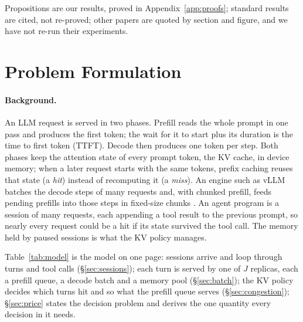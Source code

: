 \documentclass{article}
\theoremstyle{plain}
\theoremstyle{definition}
\theoremstyle{remark}
\begin{document}
Propositions are our results, proved in Appendix~\ref{app:proofs};
standard results are cited, not re-proved; other papers are quoted by
section and figure, and we have not re-run their experiments.

\section{Problem Formulation}\label{sec:model}

\paragraph{Background.} An LLM request is served in two phases. Prefill
reads the whole prompt in one pass and produces the first token; the
wait for it to start plus its duration is the time to first token
(TTFT). Decode then produces one token per step. Both phases keep the attention state of every prompt
token, the KV cache, in device memory; when a later request starts
with the same tokens, prefix caching reuses that state (a \emph{hit})
instead of recomputing it (a \emph{miss}). An engine such as vLLM
batches the decode steps of many requests and, with chunked prefill,
feeds pending prefills into those steps in fixed-size chunks
\citep{sarathi2024}. An agent program is a session of many requests,
each appending a tool result to the previous prompt, so nearly every
request could be a hit if its state survived the tool call. The memory
held by paused sessions is what the KV policy manages.

Table~\ref{tab:model} is the model on one page: sessions arrive and
loop through turns and tool calls (\S\ref{sec:sessions}); each turn is
served by one of $J$ replicas, each a prefill queue, a decode batch and
a memory pool (\S\ref{sec:batch}); the KV policy decides which turns
hit and so what the prefill queue serves (\S\ref{sec:congestion});
\S\ref{sec:price} states the decision problem and derives the one
quantity every decision in it needs.
\end{document}
